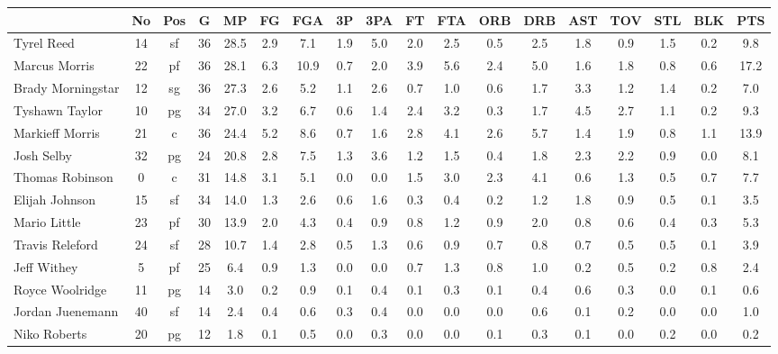 \documentclass[10pt,letterpaper]{article}
\begin{document}
\begin{table}[ht]
\begin{center}
\begin{tabular}{lccccccccccccccccc}
  \hline
 & No & Pos & G & MP & FG & FGA & 3P & 3PA & FT & FTA & ORB & DRB & AST & TOV & STL & BLK & PTS \\ 
  \hline
Tyrel Reed & 14 & sf & 36 & 28.5 & 2.9 & 7.1 & 1.9 & 5.0 & 2.0 & 2.5 & 0.5 & 2.5 & 1.8 & 0.9 & 1.5 & 0.2 & 9.8 \\ 
  Marcus Morris & 22 & pf & 36 & 28.1 & 6.3 & 10.9 & 0.7 & 2.0 & 3.9 & 5.6 & 2.4 & 5.0 & 1.6 & 1.8 & 0.8 & 0.6 & 17.2 \\ 
  Brady Morningstar & 12 & sg & 36 & 27.3 & 2.6 & 5.2 & 1.1 & 2.6 & 0.7 & 1.0 & 0.6 & 1.7 & 3.3 & 1.2 & 1.4 & 0.2 & 7.0 \\ 
  Tyshawn Taylor & 10 & pg & 34 & 27.0 & 3.2 & 6.7 & 0.6 & 1.4 & 2.4 & 3.2 & 0.3 & 1.7 & 4.5 & 2.7 & 1.1 & 0.2 & 9.3 \\ 
  Markieff Morris & 21 & c & 36 & 24.4 & 5.2 & 8.6 & 0.7 & 1.6 & 2.8 & 4.1 & 2.6 & 5.7 & 1.4 & 1.9 & 0.8 & 1.1 & 13.9 \\ 
  Josh Selby & 32 & pg & 24 & 20.8 & 2.8 & 7.5 & 1.3 & 3.6 & 1.2 & 1.5 & 0.4 & 1.8 & 2.3 & 2.2 & 0.9 & 0.0 & 8.1 \\ 
  Thomas Robinson & 0 & c & 31 & 14.8 & 3.1 & 5.1 & 0.0 & 0.0 & 1.5 & 3.0 & 2.3 & 4.1 & 0.6 & 1.3 & 0.5 & 0.7 & 7.7 \\ 
  Elijah Johnson & 15 & sf & 34 & 14.0 & 1.3 & 2.6 & 0.6 & 1.6 & 0.3 & 0.4 & 0.2 & 1.2 & 1.8 & 0.9 & 0.5 & 0.1 & 3.5 \\ 
  Mario Little & 23 & pf & 30 & 13.9 & 2.0 & 4.3 & 0.4 & 0.9 & 0.8 & 1.2 & 0.9 & 2.0 & 0.8 & 0.6 & 0.4 & 0.3 & 5.3 \\ 
  Travis Releford & 24 & sf & 28 & 10.7 & 1.4 & 2.8 & 0.5 & 1.3 & 0.6 & 0.9 & 0.7 & 0.8 & 0.7 & 0.5 & 0.5 & 0.1 & 3.9 \\ 
  Jeff Withey & 5 & pf & 25 & 6.4 & 0.9 & 1.3 & 0.0 & 0.0 & 0.7 & 1.3 & 0.8 & 1.0 & 0.2 & 0.5 & 0.2 & 0.8 & 2.4 \\ 
  Royce Woolridge & 11 & pg & 14 & 3.0 & 0.2 & 0.9 & 0.1 & 0.4 & 0.1 & 0.3 & 0.1 & 0.4 & 0.6 & 0.3 & 0.0 & 0.1 & 0.6 \\ 
  Jordan Juenemann & 40 & sf & 14 & 2.4 & 0.4 & 0.6 & 0.3 & 0.4 & 0.0 & 0.0 & 0.0 & 0.6 & 0.1 & 0.2 & 0.0 & 0.0 & 1.0 \\ 
  Niko Roberts & 20 & pg & 12 & 1.8 & 0.1 & 0.5 & 0.0 & 0.3 & 0.0 & 0.0 & 0.1 & 0.3 & 0.1 & 0.0 & 0.2 & 0.0 & 0.2 \\ 
   \hline
\end{tabular}
\end{center}
\end{table}
\end{document}
